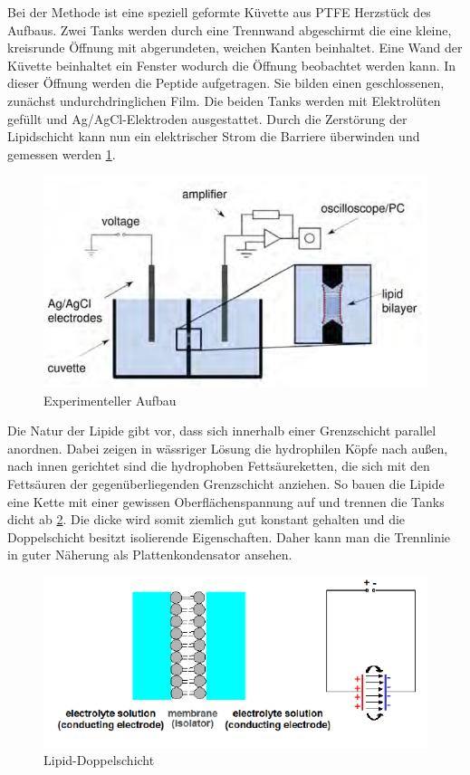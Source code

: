 \documentclass{include/thesisclass3}
\begin{document}
Bei der Methode ist eine speziell geformte Küvette aus PTFE Herzstück des Aufbaus. Zwei Tanks werden durch eine Trennwand abgeschirmt die eine kleine, kreisrunde Öffnung mit abgerundeten, weichen Kanten beinhaltet. Eine Wand der Küvette beinhaltet ein Fenster wodurch die Öffnung beobachtet werden kann. In dieser Öffnung werden die Peptide aufgetragen. Sie bilden einen geschlossenen, zunächst undurchdringlichen Film. Die beiden Tanks werden mit Elektrolüten gefüllt und Ag/AgCl-Elektroden ausgestattet. Durch die Zerstörung der Lipidschicht kann nun ein elektrischer Strom die Barriere überwinden und gemessen werden \ref{aufbau}.\\
\begin{figure}[ht]
	\begin{center}
		\includegraphics{images/experiment.png}
		\caption{Experimenteller Aufbau}
		\label{aufbau}
	\end{center}
\end{figure}
Die Natur der Lipide gibt vor, dass sich innerhalb einer Grenzschicht parallel anordnen. Dabei zeigen in wässriger Lösung die hydrophilen Köpfe nach außen, nach innen gerichtet sind die hydrophoben Fettsäureketten, die sich mit den Fettsäuren der gegenüberliegenden Grenzschicht anziehen. So bauen die Lipide eine Kette mit einer gewissen Oberflächenspannung auf und trennen die Tanks dicht ab \ref{double}. Die dicke wird somit ziemlich gut konstant gehalten und die Doppelschicht besitzt isolierende Eigenschaften. Daher kann man die Trennlinie in guter Näherung als Plattenkondensator ansehen.\\
\begin{figure}[ht]
	\begin{center}
		\includegraphics{images/lipid-doublelayer.png}
		\caption{Lipid-Doppelschicht}
	\label{double}
	\end{center}
\end{figure}
\end{document}

